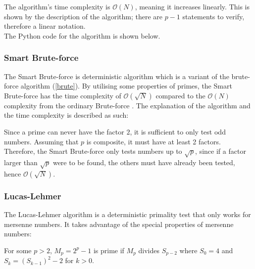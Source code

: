 \documentclass[main.tex]{subfiles}
\begin{document}
The algorithm's time complexity is $\mathcal{O}(N)$, meaning it increases
linearly. This is shown by the description of the algorithm; there are $p-1$
statements to verify, therefore a linear notation. \\

The Python code for the algorithm is shown below. \newline



\subsubsection{Smart Brute-force}

The Smart Brute-force is deterministic algorithm which is a variant of the
brute-force algorithm (\ref{brute}). By utilising some properties of primes, the
Smart Brute-force has the time complexity of $\mathcal{O}(\sqrt{N})$ compared to
the $\mathcal{O}(N)$ complexity from the ordinary Brute-force \cite{algh:brute}.
The explanation of the algorithm and the time complexity is described as such:
\\

\begin{mdframed}
  \begin{center}
    Since a prime can never have the factor $2$, it is sufficient to only test
    odd numbers. Assuming that $p$ is composite, it must have at least 2
    factors. Therefore, the Smart Brute-force only tests numbers up to
    $\sqrt{p}$, since if a factor larger than $\sqrt{p}$ were to be found, the
    others must have already been tested, hence $\mathcal{O}(\sqrt{N})$.
  \end{center}
\end{mdframed}



\subsubsection{Lucas-Lehmer}

The Lucas-Lehmer algorithm \cite{algh:lucas} is a deterministic primality test
that only works for mersenne numbers. It takes advantage of the special
properties of mersenne numbers: \newline

\begin{mdframed}
  \begin{center}
    For some $p>2$, $M_p=2^p-1$ is prime if $M_p$ divides $S_{p-2}$ where $S_0=4$ and
    $S_k=(S_{k-1})^2-2$ for $k>0$. \cite[]{algh:lucas}
  \end{center}
\end{mdframed}
\end{document}
